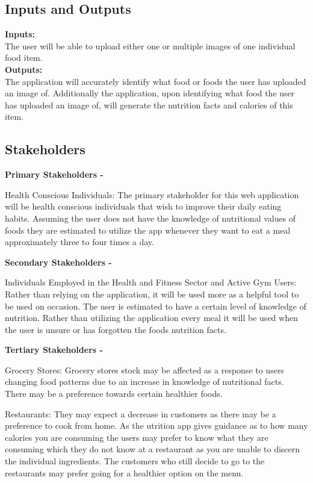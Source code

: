 \documentclass{article}
\begin{document}
\subsection{Inputs and Outputs}
\textbf{Inputs:}\\
The user will be able to upload either one or multiple images of one individual 
food item.\\
\textbf{Outputs:}\\
The application will accurately identify what food or foods the user has 
uploaded an image of. Additionally the application, upon identifying what food 
the user has uploaded an image of, will generate the nutrition facts and 
calories of this item.

\subsection{Stakeholders}

\textbf{Primary Stakeholders - } 

Health Conscious Individuals: The primary stakeholder for this web application will be health conscious individuals that wish to improve their daily eating habits. Assuming the user does not have the knowledge of nutritional values of foods they are estimated to utilize the app whenever they want to eat a meal approximately three to four times a day.

\textbf{Secondary Stakeholders - } 

Individuals Employed in the Health and Fitness Sector and Active Gym Users: Rather than relying on the application, it will be used more as a helpful tool to be used on occasion. The user is estimated to have a certain level of knowledge of nutrition. Rather than utilizing the application every meal it will be used when the user is unsure or has forgotten the foods nutrition facts.

\textbf{Tertiary Stakeholders - } 

Grocery Stores: Grocery stores stock may be affected as a response to users changing food patterns due to an increase in knowledge of nutritional facts. There may be a preference towards certain healthier foods.

Restaurants: They may expect a decrease in customers as there may be a preference to cook from home. As the utrition app gives guidance as to how many calories you are consuming the users may prefer to know what they are consuming which they do not know at a restaurant as you are unable to discern the individual ingredients. The customers who still decide to go to the restaurants may prefer going for a healthier option on the menu.
\end{document}
